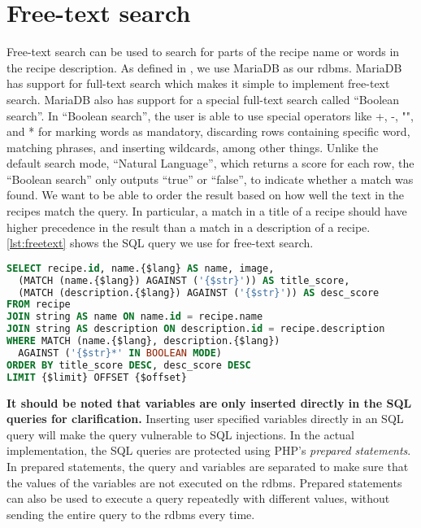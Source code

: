\section{Free-text search}
Free-text search can be used to search for parts of the recipe name or words in the recipe description. As defined in , we use MariaDB as our \ac{rdbms}. MariaDB has support for full-text search which makes it simple to implement free-text search. MariaDB also has support for a special full-text search called ``Boolean search''.\cite{mariafulltext} In ``Boolean search'', the user is able to use special operators like  +, -, "", and *  for marking words as mandatory, discarding rows containing specific word, matching phrases, and inserting wildcards, among other things. Unlike the default search mode, ``Natural Language'', which returns a score for each row, the ``Boolean search'' only outputs ``true'' or ``false'', to indicate whether a match was found. We want to be able to order the result based on how well the text in the recipes match the query. In particular, a match in a title of a recipe should have higher precedence in the result than a match in a description of a recipe.
\autoref{lst:freetext} shows the SQL query we use for free-text search.

\begin{lstlisting}[language=SQL, morekeywords={AGAINST,OFFSET,BOOLEAN,MODE}, float=h, label={lst:freetext}, caption={Free-text search.}]
SELECT recipe.id, name.{$lang} AS name, image,
  (MATCH (name.{$lang}) AGAINST ('{$str}')) AS title_score,
  (MATCH (description.{$lang}) AGAINST ('{$str}')) AS desc_score
FROM recipe
JOIN string AS name ON name.id = recipe.name
JOIN string AS description ON description.id = recipe.description
WHERE MATCH (name.{$lang}, description.{$lang})
  AGAINST ('{$str}*' IN BOOLEAN MODE)
ORDER BY title_score DESC, desc_score DESC
LIMIT {$limit} OFFSET {$offset}
\end{lstlisting}
\textbf{It should be noted that variables are only inserted directly in the SQL queries for clarification.} Inserting user specified variables directly in an SQL query will make the query vulnerable to SQL injections. In the actual implementation, the SQL queries are protected using PHP's \textit{prepared statements}. In prepared statements, the query and variables are separated to make sure that the values of the variables are not executed on the \ac{rdbms}. Prepared statements can also be used to execute a query repeatedly with different values, without sending the entire query to the \ac{rdbms} every time.

